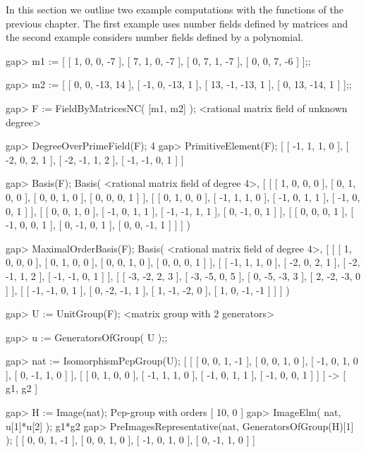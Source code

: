 

In this section we outline two example computations with the functions
of the previous chapter. The first example uses number fields defined 
by matrices and the second example considers number fields defined by
a polynomial.


\beginexample
gap> m1 := [ [ 1, 0, 0, -7 ], 
             [ 7, 1, 0, -7 ], 
             [ 0, 7, 1, -7 ],
             [ 0, 0, 7, -6 ] ];;

gap> m2 := [ [ 0, 0, -13, 14 ], 
             [ -1, 0, -13, 1 ], 
             [ 13, -1, -13, 1 ], 
             [ 0, 13, -14, 1 ] ];;

gap> F := FieldByMatricesNC( [m1, m2] );
<rational matrix field of unknown degree>

gap> DegreeOverPrimeField(F);
4
gap> PrimitiveElement(F);
[ [ -1, 1, 1, 0 ], [ -2, 0, 2, 1 ], [ -2, -1, 1, 2 ], [ -1, -1, 0, 1 ] ]

gap> Basis(F);
Basis( <rational matrix field of degree 4>, 
[ [ [ 1, 0, 0, 0 ], [ 0, 1, 0, 0 ], [ 0, 0, 1, 0 ], [ 0, 0, 0, 1 ] ], 
  [ [ 0, 1, 0, 0 ], [ -1, 1, 1, 0 ], [ -1, 0, 1, 1 ], [ -1, 0, 0, 1 ] ], 
  [ [ 0, 0, 1, 0 ], [ -1, 0, 1, 1 ], [ -1, -1, 1, 1 ], [ 0, -1, 0, 1 ] ], 
  [ [ 0, 0, 0, 1 ], [ -1, 0, 0, 1 ], [ 0, -1, 0, 1 ], [ 0, 0, -1, 1 ] ] ] )

gap> MaximalOrderBasis(F);
Basis( <rational matrix field of degree 4>, 
[ [ [ 1, 0, 0, 0 ], [ 0, 1, 0, 0 ], [ 0, 0, 1, 0 ], [ 0, 0, 0, 1 ] ],
  [ [ -1, 1, 1, 0 ], [ -2, 0, 2, 1 ], [ -2, -1, 1, 2 ], [ -1, -1, 0, 1 ] ],
  [ [ -3, -2, 2, 3 ], [ -3, -5, 0, 5 ], [ 0, -5, -3, 3 ], [ 2, -2, -3, 0 ] ],
  [ [ -1, -1, 0, 1 ], [ 0, -2, -1, 1 ], [ 1, -1, -2, 0 ], [ 1, 0, -1, -1 ] ]
 ] )

gap> U := UnitGroup(F);
<matrix group with 2 generators>

gap> u := GeneratorsOfGroup( U );;

gap> nat := IsomorphismPcpGroup(U);
[ [ [ 0, 0, 1, -1 ], [ 0, 0, 1, 0 ], [ -1, 0, 1, 0 ], [ 0, -1, 1, 0 ] ],
  [ [ 0, 1, 0, 0 ], [ -1, 1, 1, 0 ], [ -1, 0, 1, 1 ], [ -1, 0, 0, 1 ] ] ] ->
[ g1, g2 ]

gap> H := Image(nat);
Pcp-group with orders [ 10, 0 ]
gap> ImageElm( nat, u[1]*u[2] );
g1*g2
gap> PreImagesRepresentative(nat, GeneratorsOfGroup(H)[1] );
[ [ 0, 0, 1, -1 ], [ 0, 0, 1, 0 ], [ -1, 0, 1, 0 ], [ 0, -1, 1, 0 ] ]
\endexample

